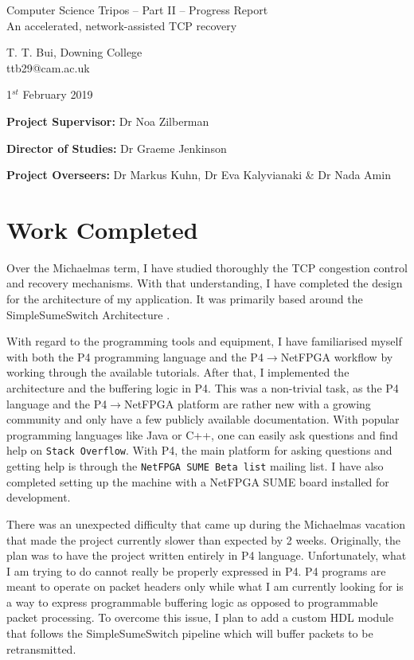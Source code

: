 \documentclass[12pt,a4paper,twoside]{article}
\begin{document}
\begin{center}
\Large
Computer Science Tripos -- Part II -- Progress Report\\[4mm]
\LARGE
An accelerated, network-assisted TCP recovery%

\large
T. T. Bui, Downing College\\
\large
ttb29@cam.ac.uk

1$^{st}$ February 2019
\end{center}

\vspace{3mm}

\textbf{Project Supervisor:} Dr Noa Zilberman

\textbf{Director of Studies:} Dr Graeme Jenkinson

\textbf{Project Overseers:} Dr Markus Kuhn, Dr Eva Kalyvianaki \& Dr Nada Amin


\section*{Work Completed}

Over the Michaelmas term, I have studied thoroughly the TCP congestion control and recovery mechanisms. With that understanding, I have completed the design for the architecture of my application. It was primarily based around the SimpleSumeSwitch Architecture \cite{simple}. 

With regard to the programming tools and equipment, I have familiarised myself with both the P4 programming language and the P4$\rightarrow$NetFPGA workflow by working through the available tutorials. After that, I implemented the architecture and the buffering logic in P4. This was a non-trivial task, as the P4 language and the P4$\rightarrow$NetFPGA platform are rather new with a growing community and only have a few publicly available documentation. With popular programming languages like Java or C++, one can easily ask questions and find help on \texttt{Stack Overflow}. With P4, the main platform for asking questions and getting help is through the \texttt{NetFPGA SUME Beta list} \cite{mailing} mailing list. I have also completed setting up the machine with a NetFPGA SUME board installed for development.

There was an unexpected difficulty that came up during the Michaelmas vacation that made the project currently slower than expected by 2 weeks. Originally, the plan was to have the project written entirely in P4 language. Unfortunately, what I am trying to do cannot really be properly expressed in P4. P4 programs are meant to operate on packet headers only while what I am currently looking for is a way to express programmable buffering logic as opposed to programmable packet processing. To overcome this issue, I plan to add a custom HDL module that follows the SimpleSumeSwitch pipeline which will buffer packets to be retransmitted.
\end{document}
